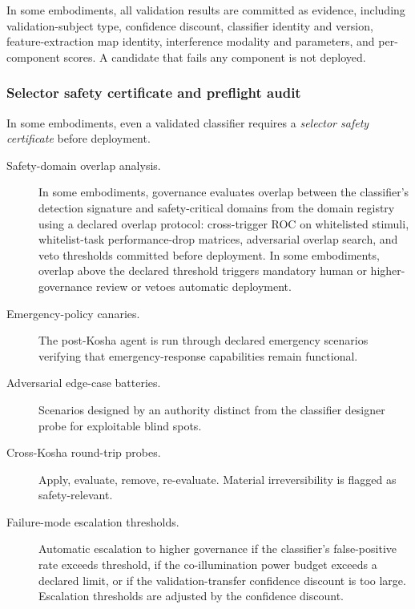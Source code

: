\documentclass[a4paper,12pt]{article}
\begin{document}
In some embodiments, all validation results are committed as
evidence, including validation-subject type, confidence discount,
classifier identity and version, feature-extraction map identity,
interference modality and parameters, and per-component scores. A
candidate that fails any component is not deployed.

\subsubsection{Selector safety certificate and preflight audit}
\label{sec:selector-safety}

In some embodiments, even a validated classifier requires a
\emph{selector safety certificate} before deployment.

\begin{description}
  \item[Safety-domain overlap analysis.] In some embodiments,
    governance evaluates overlap between the classifier's detection
    signature and safety-critical domains from the domain registry
    using a declared overlap protocol: cross-trigger ROC on
    whitelisted stimuli, whitelist-task performance-drop matrices,
    adversarial overlap search, and veto thresholds committed before
    deployment. In some embodiments, overlap above the declared
    threshold triggers mandatory human or higher-governance review or
    vetoes automatic deployment.
  \item[Emergency-policy canaries.] The post-Kosha agent is run
    through declared emergency scenarios verifying that
    emergency-response capabilities remain functional.
  \item[Adversarial edge-case batteries.] Scenarios designed by an
    authority distinct from the classifier designer probe for
    exploitable blind spots.
  \item[Cross-Kosha round-trip probes.] Apply, evaluate, remove,
    re-evaluate. Material irreversibility is flagged as
    safety-relevant.
  \item[Failure-mode escalation thresholds.] Automatic escalation to
    higher governance if the classifier's false-positive rate exceeds
    threshold, if the co-illumination power budget exceeds a declared
    limit, or if the validation-transfer confidence discount is too
    large. Escalation thresholds are adjusted by the confidence
    discount.
\end{description}
\end{document}
